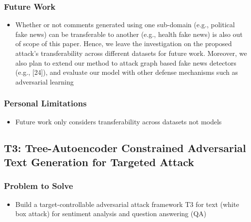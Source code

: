 \documentclass{article}
\begin{document}
\begin{flushleft}
\subsubsection*{Future Work}
\begin{itemize}
  \item Whether or not comments generated using one sub-domain (e.g., political fake news) can be transferable to another (e.g., health fake news) is also out of scope of this paper. Hence, we leave the investigation on the proposed attack’s transferability across different datasets for future work. Moreover, we also plan to extend our method to attack graph based fake news detectors (e.g., [24]), and evaluate our model
with other defense mechanisms such as adversarial learning
\end{itemize}

\subsubsection*{Personal Limitations}
\begin{itemize}
    \item Future work only considers transferability across datasets not models
\end{itemize}





\subsection{T3: Tree-Autoencoder Constrained Adversarial Text Generation for Targeted Attack  \cite{wang2019t3} }
\subsubsection*{Problem to Solve}
\begin{itemize}
    \item Build a target-controllable adversarial attack framework T3 for text (white box attack) for sentiment analysis and question answering (QA)
\end{itemize}


\end{flushleft}
\end{document}
